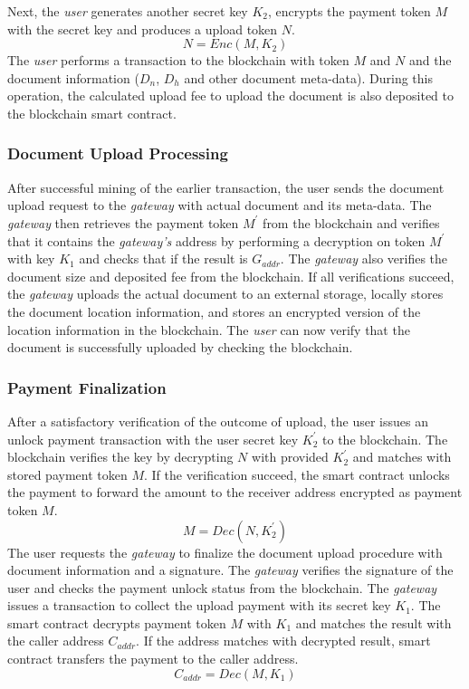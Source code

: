 \documentclass[conference]{IEEEtran}
\begin{document}
Next, the {\it user} generates another secret key $K_2$, encrypts the payment token $M$ with the secret key and produces a upload token $N$.
\begin{equation}
\label{eq-u-3}
N = Enc (M, K_2)
\end{equation}
The {\it user} performs a transaction to the blockchain with token $M$ and $N$ and the document information ($D_{n}$, $D_{h}$ and other document meta-data). During this operation, the calculated upload fee to upload the document is also deposited to the blockchain smart contract.
 
\subsubsection{Document Upload Processing}
After successful mining of the earlier transaction, the user sends the document upload request to the {\it gateway} with actual document and its meta-data. The {\it gateway} then retrieves the payment token $M^\prime$ from the blockchain and verifies that it contains the {\it gateway's} address by performing a decryption on token $M^\prime$ with key $K_1$ and checks that if the result is $G_{addr}$. The {\it gateway} also verifies the document size and deposited fee from the blockchain. If all verifications succeed, the {\it gateway} uploads the actual document to an external storage, locally stores the document location information, and stores an encrypted version of the location information in the blockchain. The {\it user} can now verify that the document is successfully uploaded by checking the blockchain. 

\subsubsection{Payment Finalization}
After a satisfactory verification of the outcome of upload, the user issues an unlock payment transaction with the user secret key $K_2^\prime$ to the blockchain. The blockchain verifies the key by decrypting $N$ with provided $K_2^\prime$ and matches with stored payment token $M$. If the verification succeed, the smart contract unlocks the payment to forward the amount to the receiver address encrypted as payment token $M$.
\begin{equation}
\label{eq-u-5}
M = Dec (N, K_2^\prime)
\end{equation}
The user requests the {\it gateway} to finalize the document upload procedure with document information and a signature. The {\it gateway} verifies the signature of the user and checks the payment unlock status from the blockchain. The {\it gateway} issues a transaction to collect the upload payment with its secret key $K_1$. The smart contract decrypts payment token $M$ with $K_1$ and matches the result with the caller address $C_{addr}$. If the address matches with decrypted result, smart contract transfers the payment to the caller  address.
\begin{equation}
\label{eq-u-6}
C_{addr} = Dec (M, K_1)
\end{equation}
\end{document}
